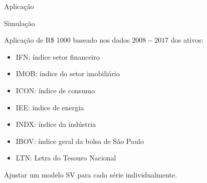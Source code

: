 \documentclass{beamer}
\begin{document}
 
\begin{frame}{}
    \begin{block}{ }
      \Huge  Aplicação
    \end{block}
\end{frame}

 
 \begin{frame}{Simulação}


Aplicação de R\$ $1000$ baseado nos dados $2008-2017$ dos ativos:
\vspace{.25cm}
\begin{itemize}
\item IFN:  índice setor financeiro
\item IMOB: índice do setor imobiliário
\item ICON: índice de consumo
\item IEE:  índice de energia
\item INDX: índice da indústria
\item IBOV: índice geral da bolsa de São Paulo
\item LTN: Letra do Tesouro Nacional
\end{itemize}
\vspace{.25cm}

Ajustar um modelo SV para cada série individualmente.
\end{frame}
\end{document}
